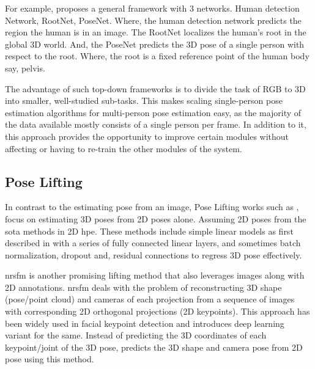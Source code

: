 For example, \cite{CameraDistanceAware} proposes a general framework with 3 networks. Human detection Network, RootNet, PoseNet. Where, the human detection network predicts the region the human is in an image. The RootNet localizes the human's root in the global 3D world. And, the PoseNet predicts the 3D pose of a single person with respect to the root. Where, the root is a fixed reference point of the human body say, pelvis.

The advantage of such top-down frameworks is to divide the task of RGB to 3D into smaller, well-studied sub-tasks. This makes scaling single-person pose estimation algorithms for multi-person pose estimation easy, as the majority of the data available mostly consists of a single person per frame. In addition to it, this approach provides the opportunity to improve certain modules without affecting or having to re-train the other modules of the system.

\subsection{Pose Lifting}

In contrast to the estimating pose from an image, Pose Lifting works such as \cite{poselifter,  amazon1, repnet, c3dpo, unsupervisedAdversarial}, focus on estimating 3D poses from 2D poses alone. Assuming 2D poses from the \ac{sota} methods in 2D \ac{hpe}. These methods include simple linear models as first described in \cite{MartinezHRL17} with a series of fully connected linear layers, and sometimes batch normalization, dropout and, residual connections to regress 3D pose effectively.

\ac{nrsfm} is another promising lifting method that also leverages images along with 2D annotations. \ac{nrsfm} deals with the problem of reconstructing 3D shape (pose/point cloud) and cameras of each projection from a sequence of images with corresponding 2D orthogonal projections (2D keypoints). This approach has been widely used in facial keypoint detection and \cite{deepNRSFM} introduces deep learning variant for the same. Instead of predicting the 3D coordinates of each keypoint/joint of the 3D pose, \cite{DistillNRSfM, c3dpo, deepNRSFM, nrsfm++} predicts the 3D shape and camera pose from 2D pose using this method.

